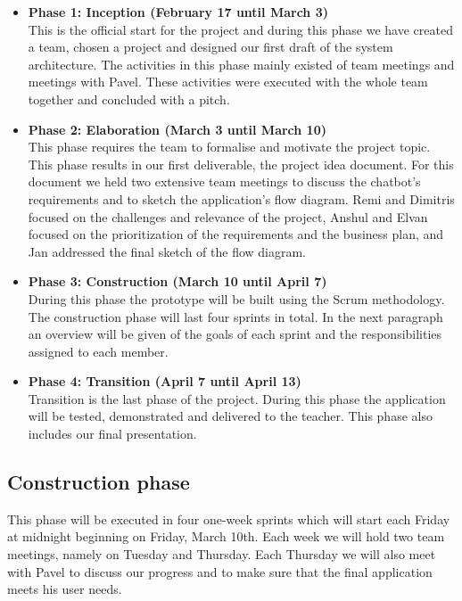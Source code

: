 \documentclass[a4paper,dutch,fleqn]{exam}
\begin{document}
\begin{itemize}
\itemsep0em 
\item \textbf{Phase 1: Inception (February 17 until March 3)} \\
This is the official start for the project and during this phase we have created a team, chosen a project and designed our first draft of the system architecture. The activities in this phase mainly existed of team meetings and meetings with Pavel. These activities were executed with the whole team together and concluded with a pitch.

\item \textbf{Phase 2: Elaboration (March 3 until March 10)} \\
This phase requires the team to formalise and motivate the project topic. This phase results in  our first deliverable, the project idea document. For this document we held two extensive team meetings to discuss the chatbot's requirements and to sketch the application's flow diagram. Remi and Dimitris focused on the challenges and relevance of the project, Anshul and Elvan focused on the prioritization of the requirements and the business plan, and Jan addressed the final sketch of the flow diagram. 

\item \textbf{Phase 3: Construction (March 10 until April 7)} \\
During this phase the prototype will be built using the Scrum methodology. The construction phase will last four sprints in total. In the next paragraph an overview will be given of the goals of each sprint and the responsibilities assigned to each member.

\item \textbf{Phase 4: Transition (April 7 until  April 13)} \\
Transition is the last phase of the project. During this phase the application will be tested, demonstrated and delivered to the teacher. This phase also includes our final presentation.
\end{itemize}

\subsection{Construction phase} 
This phase will be executed in four one-week sprints which will start each Friday at midnight beginning on Friday, March 10th. Each week we will hold two team meetings, namely on Tuesday and Thursday. Each Thursday we will also meet with Pavel to discuss our progress and to make sure that the final application meets his user needs.  
\end{document}
